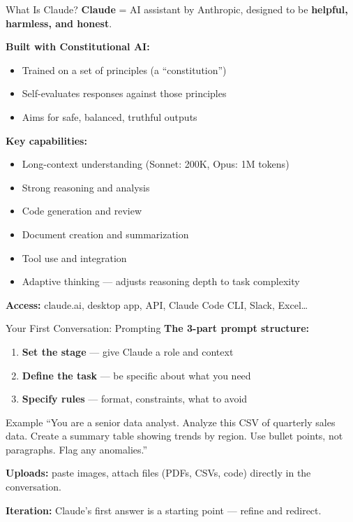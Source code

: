 \documentclass[aspectratio=169]{beamer}
\begin{document}
\begin{frame}{What Is Claude?}
\textbf{Claude} = AI assistant by Anthropic, designed to be \textbf{helpful, harmless, and honest}.

\bigskip
\textbf{Built with Constitutional AI:}
\begin{itemize}
  \item Trained on a set of principles (a ``constitution'')
  \item Self-evaluates responses against those principles
  \item Aims for safe, balanced, truthful outputs
\end{itemize}

\bigskip
\textbf{Key capabilities:}
\begin{itemize}
  \item Long-context understanding (Sonnet: 200K, Opus: 1M tokens)
  \item Strong reasoning and analysis
  \item Code generation and review
  \item Document creation and summarization
  \item Tool use and integration
  \item Adaptive thinking --- adjusts reasoning depth to task complexity
\end{itemize}

\bigskip
\textbf{Access:} claude.ai, desktop app, API, Claude Code CLI, Slack, Excel\ldots
\end{frame}

\begin{frame}{Your First Conversation: Prompting}
\textbf{The 3-part prompt structure:}

\begin{enumerate}
  \item \textbf{\color{popblue}Set the stage} --- give Claude a role and context
  \item \textbf{\color{paramgreen}Define the task} --- be specific about what you need
  \item \textbf{\color{orange1}Specify rules} --- format, constraints, what to avoid
\end{enumerate}

\bigskip
\begin{exampleblock}{Example}
``You are a senior data analyst. Analyze this CSV of quarterly sales data. Create a summary table showing trends by region. Use bullet points, not paragraphs. Flag any anomalies.''
\end{exampleblock}

\bigskip
\textbf{Uploads:} paste images, attach files (PDFs, CSVs, code) directly in the conversation.

\textbf{Iteration:} Claude's first answer is a starting point --- refine and redirect.
\end{frame}
\end{document}
